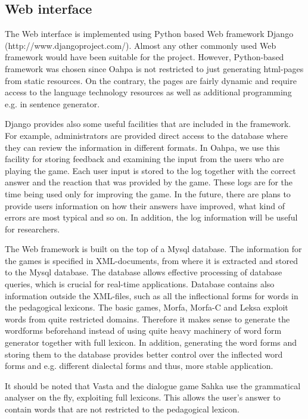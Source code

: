 \documentclass[a4paper,12pt]{article}
\begin{document}
\subsection{Web interface}
The Web interface is implemented using Python based Web framework Django (http://www.djangoproject.com/). Almost any other commonly used Web framework would have been suitable for the project. However, Python-based framework was chosen since Oahpa is not restricted to just generating html-pages from static resources. On the contrary, the pages are fairly dynamic and require access to the language technology resources as well as additional programming e.g. in sentence generator. 

Django provides also some useful facilities that are included in the framework. For example, administrators are provided direct access to the database where they can review the information in different formats. In Oahpa, we use this facility for storing feedback and examining the input from the users who are playing the game. Each user input is stored to the log together with the correct answer and the reaction that was provided by the game. These logs are for the time being used only for improving the game. In the future, there are plans to provide users information on how their answers have improved, what kind of errors are most typical and so on. In addition, the log information will be useful for researchers. 

The Web framework is built on the top of a Mysql database. The information for the games is specified in XML-documents, from where it is extracted and stored to the Mysql database. The database allows effective processing of database queries, which is crucial for real-time applications. Database contains also information outside the XML-files, such as all the inflectional forms for words in the pedagogical lexicons. The basic games, Morfa, Morfa-C and Leksa exploit words from quite restricted domains. Therefore it makes sense to generate the wordforms beforehand instead of using quite heavy machinery of word form generator together with full lexicon. In addition, generating the word forms and storing them to the database provides better control over the inflected word forms and e.g. different dialectal forms and thus, more stable application.

It should be noted that Vasta and the dialogue game Sahka use the grammatical analyser on the fly, exploiting full lexicons. This allows the user's answer to contain words that are not restricted to the pedagogical lexicon.
\end{document}
